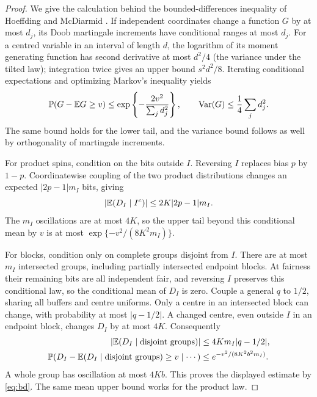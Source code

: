 \begin{proof}
We give the calculation behind the bounded-differences inequality of Hoeffding and McDiarmid \cite{Hoeffding63,McDiarmid89}. If independent coordinates change a function $G$ by at most $d_j$, its Doob martingale increments have conditional ranges at most $d_j$. For a centred variable in an interval of length $d$, the logarithm of its moment generating function has second derivative at most $d^2/4$ (the variance under the tilted law); integration twice gives an upper bound $s^2d^2/8$. Iterating conditional expectations and optimizing Markov's inequality yields
\begin{equation}\label{eq:bd}
 \mathbb P(G-\mathbb E G\ge v)\le
 \exp\left\{-\frac{2v^2}{\sum_j d_j^2}\right\},
 \qquad \operatorname{Var}(G)\le\frac14\sum_jd_j^2.
\end{equation}
The same bound holds for the lower tail, and the variance bound follows as well by orthogonality of martingale increments.

For product spins, condition on the bits outside $I$. Reversing $I$ replaces bias $p$ by $1-p$. Coordinatewise coupling of the two product distributions changes an expected $|2p-1|m_I$ bits, giving
\[
 |\mathbb E(D_I\mid I^c)|\le2K|2p-1|m_I.
\]
The $m_I$ oscillations are at most $4K$, so the upper tail beyond this conditional mean by $v$ is at most $\exp\{-v^2/(8K^2m_I)\}$.

For blocks, condition only on complete groups disjoint from $I$. There are at most $m_I$ intersected groups, including partially intersected endpoint blocks. At fairness their remaining bits are all independent fair, and reversing $I$ preserves this conditional law, so the conditional mean of $D_I$ is zero. Couple a general $q$ to $1/2$, sharing all buffers and centre uniforms. Only a centre in an intersected block can change, with probability at most $|q-1/2|$. A changed centre, even outside $I$ in an endpoint block, changes $D_I$ by at most $4K$. Consequently
\begin{equation}\label{eq:blocktail}
\begin{aligned}
 |\mathbb E(D_I\mid\text{disjoint groups})|&\le4Km_I|q-1/2|,\\
 \mathbb P(D_I-\mathbb E(D_I\mid\text{disjoint groups})\ge v\mid\cdots)
 &\le e^{-v^2/(8K^2b^2m_I)}.
\end{aligned}
\end{equation}
A whole group has oscillation at most $4Kb$. This proves the displayed estimate by \eqref{eq:bd}. The same mean upper bound works for the product law.


\end{proof}
